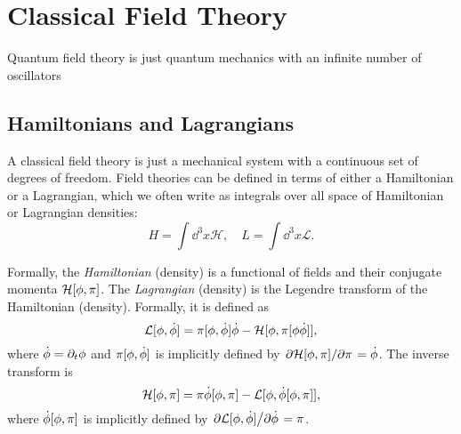 \section{Classical Field Theory}
Quantum field theory is just quantum mechanics with an infinite number of oscillators

\subsection{Hamiltonians and Lagrangians}
A classical field theory is just a mechanical system with a continuous set of degrees of freedom. Field theories can be defined in terms of either a Hamiltonian or a Lagrangian, which we often write as integrals over all space of Hamiltonian or Lagrangian densities:
\begin{equation}
	H=\int\dd^3x\mathcal{H},\quad L=\int\dd^3x\mathcal{L}.
\end{equation}

Formally, the \textit{Hamiltonian} (density) is a functional of fields and their conjugate momenta $\mathcal{H}[\phi,\pi ]$. The \textit{Lagrangian} (density) is the Legendre transform of the Hamiltonian (density). Formally, it is defined as
\begin{equation}
  \mathcal{L}[\phi,\dot{\phi }]=\pi [\phi,\dot{\phi }]\dot{\phi }-\mathcal{H}[\phi,\pi[\phi\dot{\phi }]],
\end{equation}
where $\dot{\phi }=\partial_t\phi $ and $\pi [\phi,\dot{\phi }]$ is implicitly defined by $\pdv*{\mathcal{H}[\phi,\pi ]}{\pi }=\dot{\phi }$. The inverse transform is
\begin{equation}
  \mathcal{H}[\phi,\pi ]=\pi \dot{\phi }[\phi,\pi ]-\mathcal{L}[\phi,\dot{\phi }[\phi,\pi ]],
\end{equation}
where $\dot{\phi }[\phi,\pi ]$ is implicitly defined by $\pdv*{\mathcal{L}[\phi,\dot{\phi }]}{\dot{\phi }}=\pi $.



